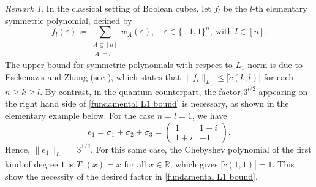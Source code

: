 \documentclass{amsbook}
\theoremstyle{definition}
\theoremstyle{remark}
\newtheorem{remark}[theorem]{Remark}
\numberwithin{section}{chapter}
\numberwithin{equation}{chapter}
\newcommand{\1}{\mathbf{1}}
\begin{document}
\begin{remark}
In the classical setting of Boolean cubes, let $f_{l}$ be the $l$-th elementary symmetric polynomial, defined by
\[
f_{l}(\varepsilon)\coloneqq \sum_{\substack{A\subseteq [n]\\|A|=l}}w_{A}(\varepsilon),\quad \varepsilon\in\{-1,1\}^{n},~\mbox{with }l\in[n].
\]
The upper bound for symmetric polynomials with respect to $L_{1}$ norm is due to Esekenazis and Zhang (see \cite[Theorem 4]{EZ2024}), which states that $\|f_{l}\|_{L_{1}}\leq |\tilde{c}(k,l)|$ for each $n\geq k\geq l$. By contrast, in the quantum counterpart, the factor $3^{l/2}$ appearing on the right hand side of \eqref{fundamental L1 bound} is necessary, as shown in the elementary example below. For the case $n=l=1$, we have
\[
e_{1}=\sigma_{1}+\sigma_{2}+\sigma_{3}=
\begin{pmatrix}
1&1-i\\
1+i&-1
\end{pmatrix}.
\]
Hence, $\|e_{1}\|_{L_{1}}=3^{1/2}$. For this same case, the Chebyshev polynomial of the first kind of degree $1$ is $T_{1}(x)=x$ for all $x\in \mathbb{R}$, which gives $|\tilde{c}(1,1)|=1$. This show the necessity of the desired factor in \eqref{fundamental L1 bound}.
\end{remark}
\end{document}
